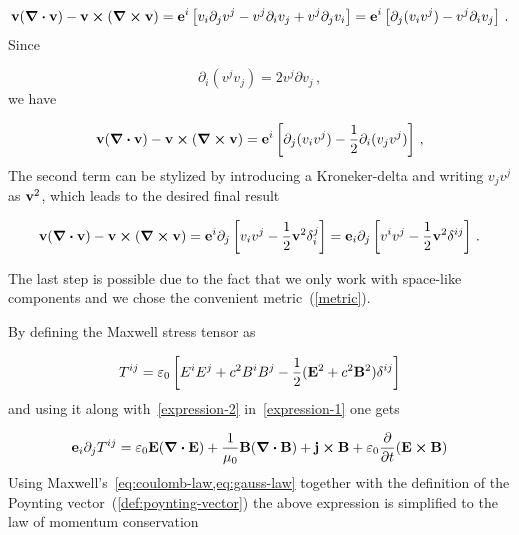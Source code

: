 \documentclass[12pt, class=report, crop=false]{standalone}
\begin{document}
\begin{equation*}
  \vb{v}(\div{\vb{v}}) - \vb{v}\cp(\curl{\vb{v}}) = \vb{e}^{i} \left[ v_{i} \partial_{j} v^{j} - v^{j} \partial_{i} v_{j} + v^{j} \partial_{j} v_{i} \right] = \vb{e}^{i} \left[ \partial_{j} (v_{i} v^{j}) - v^{j} \partial_{i} v_{j} \right] \,.
\end{equation*}
Since

\begin{equation*}
  \partial_{i} (v^{j} v_{j}) = 2 v^{j} \partial v_{j} \,,
\end{equation*}
we have

\begin{equation*}
  \vb{v}(\div{\vb{v}}) - \vb{v}\cp(\curl{\vb{v}}) = \vb{e}^{i} \left[ \partial_{j} (v_{i} v^{j}) - \frac{1}{2} \partial_{i} (v_{j}v^{j}) \right] \,,
\end{equation*}
The second term can be stylized by introducing a Kroneker-delta and writing \(v_{j}v^{j}\) as \(\vb{v}^{2}\), which leads to the desired final result

\begin{equation}
  \label{expression-2}
  \vb{v}(\div{\vb{v}}) - \vb{v}\cp(\curl{\vb{v}}) = \vb{e}^{i} \partial_{j} \left[ v_{i} v^{j} - \frac{1}{2} \vb{v}^{2} \delta_{i}^{j} \right] = \vb{e}_{i} \partial_{j} \left[ v^{i} v^{j} - \frac{1}{2} \vb{v}^{2} \delta^{ij} \right]\,.
\end{equation}

\par
The last step is possible due to the fact that we only work with space-like components and we chose the convenient metric~(\ref{metric}).
\par
By defining the Maxwell stress tensor as

\begin{equation}
  T^{ij} = \varepsilon_0 \left[ E^{i}E^{j} + c^{2} B^{i}B^{j} - \frac{1}{2} (\vb{E}^{2} + c^{2}\vb{B}^2) \delta^{ij} \right]
\end{equation}
and using it along with~\cref{expression-2} in~\cref{expression-1} one gets

\begin{equation*}
  \vb{e}_{i} \partial_{j} T^{ij} = \varepsilon_0 \vb{E}(\div{\vb{E}}) + \frac{1}{\mu_0} \vb{B}(\div{\vb{B}}) + \vb{j}\cp\vb{B} + \varepsilon_0 \pdv{t}(\vb{E}\cp\vb{B})
\end{equation*}
Using Maxwell's~\cref{eq:coulomb-law,eq:gauss-law} together with the definition of the Poynting vector~(\ref{def:poynting-vector}) the above expression is simplified to the law of momentum conservation
\end{document}
